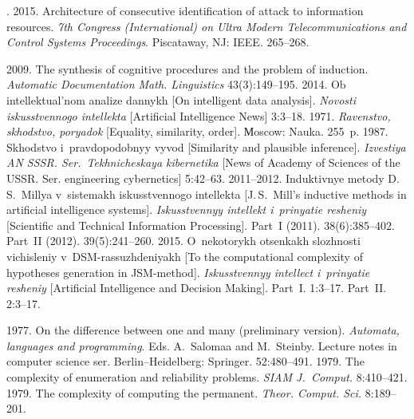 
  \begin{multicols}{2}

\renewcommand{\bibname}{\protect\rmfamily References}

{\small\frenchspacing
 {%
 \begin{thebibliography}{99} 
     . 2015. 
Architecture of consecutive identification of attack to information resources. \textit{7th Congress 
(International) on Ultra Modern Telecommunications and Control Systems Proceedings}.
 Piscataway, NJ: IEEE. 265--268.
   
      2009. The synthesis of cognitive procedures and the problem of induction. 
\textit{Automatic Documentation Math. Linguistics} 43(3):149--195.
      2014. Ob intellektual'nom analize dannykh [On intelligent data analysis]. 
\textit{Novosti iskusstvennogo intellekta} [Artificial Intelligence News] 3:3--18.
      1971. \textit{Ravenstvo, skhodstvo, poryadok} [Equality, similarity, 
order]. Мoscow: Nauka. 255~p.
      1987. Skhodstvo i~pravdopodobnyy vyvod 
[Similarity and plausible inference]. \textit{Izvestiya AN SSSR. Ser.~Tekhnicheskaya kibernetika} 
[News of Academy of Sciences of the USSR. Ser. engineering cybernetics] 5:42--63. 
      2011--2012. Induktivnye metody D.\,S.~Millya v~sistemakh 
iskusstvennogo intellekta [J.\,S.~Mill's inductive methods in artificial intelligence systems]. 
\textit{Iskusstvennyy intellekt i~prinyatie resheniy} 
[Scientific and Technical Information Processing]. 
Part~I (2011). 38(6):385--402. Part~II (2012). 39(5):241--260.
      2015. O~nekotorykh otsenkakh slozhnosti vichisleniy  
v~DSM-rassuzhdeniyakh [To the computational complexity of hypotheses generation in\linebreak  
JSM-method]. \textit{Iskusstvennyy intellect i~prinyatie resheniy} [Artificial Intelligence and 
Decision Making]. Part~I. 1:3--17. Part~II. 2:3--17. 
     
      1977. On the difference between one and many (preliminary version).
     \textit{Automata, languages and programming}. Eds. A.~Salomaa and M.~Steinby.
     Lecture notes in computer 
science ser. Berlin--Heidelberg: Springer. 52:480--491.
      1979. The complexity of enumeration and reliability problems. 
\textit{SIAM J.~Comput.} 8:410--421.
      1979. The complexity of computing the permanent. 
     \textit{Theor. Comput. Sci.} 8:189--201.
     

\end{thebibliography}}}
\end{multicols}

